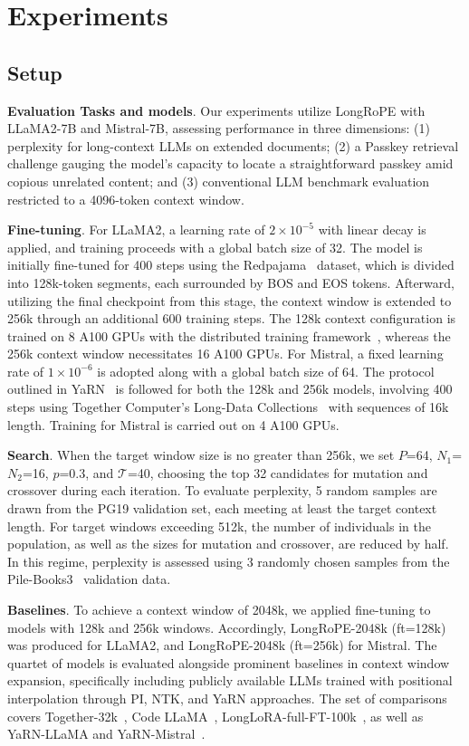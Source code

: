  \section{Experiments}

\label{sec:exp}
\subsection{Setup}
\textbf{Evaluation Tasks and models}. Our experiments utilize LongRoPE with LLaMA2-7B and Mistral-7B, assessing performance in three dimensions: (1) perplexity for long-context LLMs on extended documents; (2) a Passkey retrieval challenge gauging the model’s capacity to locate a straightforward passkey amid copious unrelated content; and (3) conventional LLM benchmark evaluation restricted to a 4096-token context window.

\textbf{Fine-tuning}. For LLaMA2, a learning rate of $2 \times 10^{-5}$ with linear decay is applied, and training proceeds with a global batch size of 32. The model is initially fine-tuned for 400 steps using the Redpajama~\cite{redpajama} dataset, which is divided into 128k-token segments, each surrounded by BOS and EOS tokens. Afterward, utilizing the final checkpoint from this stage, the context window is extended to 256k through an additional 600 training steps. The 128k context configuration is trained on 8 A100 GPUs with the distributed training framework~\cite{cube}, whereas the 256k context window necessitates 16 A100 GPUs. For Mistral, a fixed learning rate of $1 \times 10^{-6}$ is adopted along with a global batch size of 64. The protocol outlined in YaRN~\cite{yarn} is followed for both the 128k and 256k models, involving 400 steps using Together Computer’s Long-Data Collections~\cite{mistraldata} with sequences of 16k length. Training for Mistral is carried out on 4 A100 GPUs.

\textbf{Search}. When the target window size is no greater than 256k, we set $P$=64, $N_1$=$N_2$=16, $p$=0.3, and $\mathcal{T}$=40, choosing the top 32 candidates for mutation and crossover during each iteration. To evaluate perplexity, 5 random samples are drawn from the PG19 validation set, each meeting at least the target context length. For target windows exceeding 512k, the number of individuals in the population, as well as the sizes for mutation and crossover, are reduced by half. In this regime, perplexity is assessed using 3 randomly chosen samples from the Pile-Books3~\cite{pile} validation data.

\textbf{Baselines}. To achieve a context window of 2048k, we applied fine-tuning to models with 128k and 256k windows. Accordingly, LongRoPE-2048k (ft=128k) was produced for LLaMA2, and LongRoPE-2048k (ft=256k) for Mistral. The quartet of models is evaluated alongside prominent baselines in context window expansion, specifically including publicly available LLMs trained with positional interpolation through PI, NTK, and YaRN approaches. The set of comparisons covers Together-32k~\cite{together}, Code LLaMA~\cite{codellama}, LongLoRA-full-FT-100k~\cite{longlora}, as well as YaRN-LLaMA and YaRN-Mistral~\cite{yarn}.

